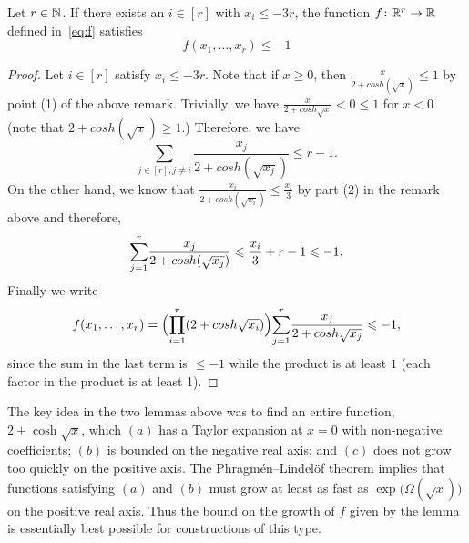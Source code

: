 \begin{lemma}
  \label{lem:special:function:2} %
  \leanok
  Let \(r \in \mathbb{N}\). If there exists an \(i \in [r]\) with \(x_i \le - 3r\), the function \(f \colon \mathbb{R}^r \rightarrow \mathbb{R}\) defined in~\eqref{eq:f} satisfies
  \begin{equation*}
    f(x_1,\dots,x_r) \le -1
  \end{equation*}
\end{lemma}
%
\begin{proof}
  Let \(i \in [r]\) satisfy \(x_i \leq -3r\). Note that if \(x\geq 0\), then \(\frac{x}{2+cosh(\sqrt{x})}\leq 1\) by point (1) of the above remark.
  Trivially, we have \(\frac{x}{2+cosh{\sqrt{x}}}<0\leq 1\) for \(x<0\) (note that \(2+cosh(\sqrt{x})\geq 1\).)
  Therefore, we have 
  \begin{equation*}
    \underset{j \in [r], j \neq i}{\sum} \frac{x_j}{2+cosh(\sqrt{x_j})} \leq r-1.
  \end{equation*}
  On the other hand, we know that \(\frac{x_i}{2+cosh(\sqrt{x_i})} \leq \frac{x_i}{3}\) by part (2) in the remark above and therefore,
  \begin{equation*}
    \overunderset{r}{j=1}{\sum}\frac{x_j}{2+cosh(\sqrt{x_j})}\leq \frac{x_i}{3}+r-1\leq -1.
  \end{equation*}
  Finally we write 
  \begin{equation*}
    f(x_1,\dots,x_r) = \Bigl(\overunderset{r}{i=1}{\prod}(2+cosh\sqrt{x_i})\Bigr)\overunderset{r}{j=1}{\sum}\frac{x_j}{2+cosh \sqrt{x_j}} \leq -1,
  \end{equation*}
  since the sum in the last term is \(\leq -1\) while the product is at least \(1\) (each factor in the product is at least 1).
\end{proof}

\begin{remark}
	The key idea in the two lemmas above was to find an entire function, \(2 + \cosh\sqrt{x}\), which \((a)\) has a Taylor expansion at \(x = 0\) with non-negative coefficients; \((b)\) is bounded on the negative real axis; and \((c)\) does not grow too quickly on the positive axis. The Phragm\'en--Lindel\"of theorem
	implies that functions satisfying \((a)\) and \((b)\) must grow at least as fast as \(\exp\big( \Omega(\sqrt{x}) \big)\) on the positive real axis.  Thus the bound on the growth of \(f\) given by the lemma is essentially best possible for constructions of this type.
\end{remark}

